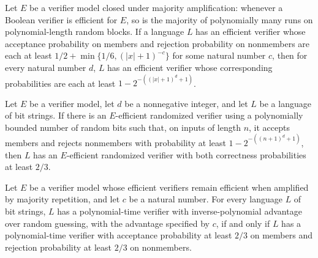 \begin{theorem}
\label{Randomized.bpp_error_reduction}
\leanok
{}
Let $E$ be a verifier model closed under majority amplification: whenever a Boolean
verifier is efficient for $E$, so is the majority of polynomially many runs on
polynomial-length random blocks. If a language $L$ has an efficient verifier whose
acceptance probability on members and rejection probability on nonmembers are each at
least $1/2+\min\{1/6,(|x|+1)^{-c}\}$ for some natural number $c$, then for every natural
number $d$, $L$ has an efficient verifier whose corresponding probabilities are each at
least $1-2^{-((|x|+1)^d+1)}$.
\end{theorem}

\begin{theorem}
\label{Randomized.InBPPStrong.toInBPP}
\leanok
{}
Let $E$ be a verifier model, let $d$ be a nonnegative integer, and let $L$ be a language
of bit strings. If there is an $E$-efficient randomized verifier using a polynomially
bounded number of random bits such that, on inputs of length $n$, it accepts members and
rejects nonmembers with probability at least $1-2^{-((n+1)^d+1)}$, then $L$ has an
$E$-efficient randomized verifier with both correctness probabilities at least $2/3$.
\end{theorem}

\begin{theorem}
\label{Randomized.inBPPWeak_iff_inBPP}
\leanok
{}
Let $E$ be a verifier model whose efficient verifiers remain efficient when amplified by
majority repetition, and let $c$ be a natural number. For every language $L$ of bit
strings, $L$ has a polynomial-time verifier with inverse-polynomial advantage over
random guessing, with the advantage specified by $c$, if and only if $L$ has a
polynomial-time verifier with acceptance probability at least $2/3$ on members and
rejection probability at least $2/3$ on nonmembers.
\end{theorem}

